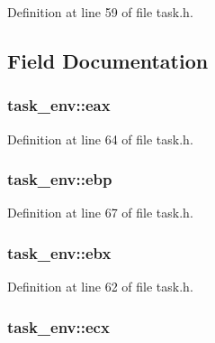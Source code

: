 Definition at line 59 of file task.\+h.



\subsection{Field Documentation}
\hypertarget{structtask__env_a617049724b4b79278b4fe107d9df7e3e}{
\subsubsection[{eax}]{ task\+\_\+env\+::eax}}\label{structtask__env_a617049724b4b79278b4fe107d9df7e3e}


Definition at line 64 of file task.\+h.

\hypertarget{structtask__env_a6630718bd69f6876f2ff74299316ae47}{
\subsubsection[{ebp}]{ task\+\_\+env\+::ebp}}\label{structtask__env_a6630718bd69f6876f2ff74299316ae47}


Definition at line 67 of file task.\+h.

\hypertarget{structtask__env_a8594000ef53ff5bb74343e54648fd5e1}{
\subsubsection[{ebx}]{ task\+\_\+env\+::ebx}}\label{structtask__env_a8594000ef53ff5bb74343e54648fd5e1}


Definition at line 62 of file task.\+h.

\hypertarget{structtask__env_a069a27e98e74717519066b7e73e9bc0e}{
\subsubsection[{ecx}]{ task\+\_\+env\+::ecx}}\label{structtask__env_a069a27e98e74717519066b7e73e9bc0e}


